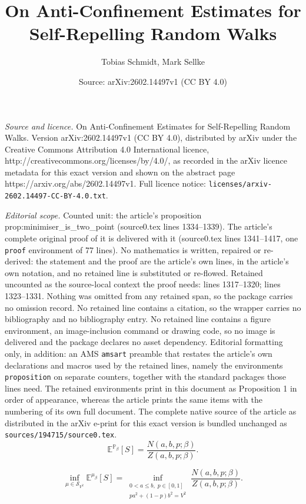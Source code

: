 \documentclass[10pt,a4paper]{amsart}
\title{On Anti-Confinement Estimates for Self-Repelling Random Walks}
\author{Tobias Schmidt, Mark Sellke}
\date{Source: arXiv:2602.14497v1 (CC BY 4.0)}
\newcommand{\bbP}{{\mathbb P}}
\begin{document}
\maketitle

\noindent\emph{Source and licence.} On Anti-Confinement Estimates for Self-Repelling Random Walks. Version arXiv:2602.14497v1 (CC BY 4.0), distributed by arXiv under the Creative Commons Attribution 4.0 International licence, http://creativecommons.org/licenses/by/4.0/, as recorded in the arXiv licence metadata for this exact version and shown on the abstract page https://arxiv.org/abs/2602.14497v1. Full licence notice: \texttt{licenses/arxiv-2602.14497-CC-BY-4.0.txt}.\par\smallskip

\noindent\textit{Editorial scope.} Counted unit: the article's proposition prop:minimiser\_is\_two\_point (source0.tex lines 1334--1339). The article's complete original proof of it is delivered with it (source0.tex lines 1341--1417, one \texttt{proof} environment of 77 lines). No mathematics is written, repaired or re-derived: the statement and the proof are the article's own lines, in the article's own notation, and no retained line is substituted or re-flowed.  Retained uncounted as the source-local context the proof needs: lines 1317--1320; lines 1323--1331.  Nothing was omitted from any retained span, so the package carries no omission record.  No retained line contains a citation, so the wrapper carries no bibliography and no bibliography entry.  No retained line contains a figure environment, an image-inclusion command or drawing code, so no image is delivered and the package declares no asset dependency.  Editorial formatting only, in addition: an AMS \texttt{amsart} preamble that restates the article's own declarations and macros used by the retained lines, namely the environments \texttt{proposition} on separate counters, together with the standard packages those lines need.  The retained environments print in this document as Proposition 1 in order of appearance, whereas the article prints the same items with the numbering of its own full document.  The complete native source of the article as distributed in the arXiv e-print for this exact version is bundled unchanged as \texttt{sources/194715/source0.tex}.
\begin{equation}\label{eq:S-tilted-ratio-four-point}
    \mathbb{E}^{\bbP_\beta}[S]
    = \frac{N(a,b,p;\beta)}{Z(a,b,p;\beta)}.
\end{equation}

\begin{equation}
    \label{equ:two-dim_optimization_problem}
    \inf_{\mu\in\mathcal{S}_{V^{2}}}
        \mathbb{E}^{\mu_\beta}[S]
    =
    \inf_{\substack{0<a\le b,\; p\in[0,1]\\
                    pa^{2}+(1-p)b^{2}=V^{2}}}
        \frac{N(a,b,p;\beta)}{Z(a,b,p;\beta)}.
\end{equation}
\end{document}

